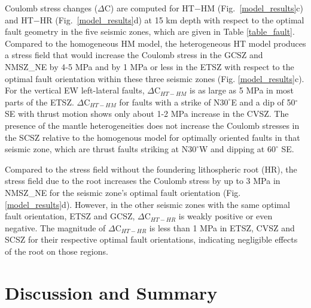 \documentclass[draft,linenumbers]{agujournal2018}
\begin{document}
Coulomb stress changes ($\Delta $C) are computed for HT$-$HM (Fig.~\ref{model_results}c) and HT$-$HR (Fig.~\ref{model_results}d) at 15 km depth with respect to the optimal fault geometry in the five seismic zones, which are given in Table \ref{table_fault}. 
Compared to the homogeneous HM model, the heterogeneous HT model produces a stress field that would increase the Coulomb stress in the GCSZ and  NMSZ\_NE by 4-5 MPa and by 1 MPa or less in the ETSZ with respect to the optimal fault orientation within these three seismic zones (Fig. \ref{model_results}c). For the vertical EW left-lateral faults, $\Delta$C$_{HT-HM}$ is as large as 5 MPa in most parts of the ETSZ. $\Delta$C$_{HT-HM}$ for faults with a strike of N$30^\circ$E and a dip of 50$^\circ$ SE with thrust motion shows only about 1-2 MPa increase in the CVSZ. The presence of the mantle heterogeneities does not increase the Coulomb stresses in the SCSZ relative to the homogenous model for optimally oriented faults in that seismic zone, which are thrust faults striking at N$30^\circ$W and dipping at $60^\circ$ SE. %

Compared to the stress field without the foundering lithospheric root (HR), the stress field due to the root increases the Coulomb stress by up to 3 MPa in NMSZ\_NE for the seismic zone's optimal fault orientation (Fig. \ref{model_results}d). However, in the other seismic zones with the same optimal fault orientation, ETSZ and GCSZ, $\Delta $C$_{HT-HR}$ is weakly positive or even negative. The magnitude of $\Delta $C$_{HT-HR}$ is less than 1 MPa in ETSZ, CVSZ and SCSZ for their respective optimal fault orientations, indicating negligible effects of the root on those regions. 
    
\section{Discussion and Summary}
    
\end{document}
